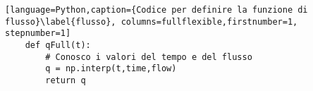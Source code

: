 \begin{lstlisting}[language=Python,caption={Codice per definire la funzione di flusso}\label{flusso}, columns=fullflexible,firstnumber=1, stepnumber=1]
    def qFull(t):
        # Conosco i valori del tempo e del flusso
        q = np.interp(t,time,flow)
        return q
\end{lstlisting}